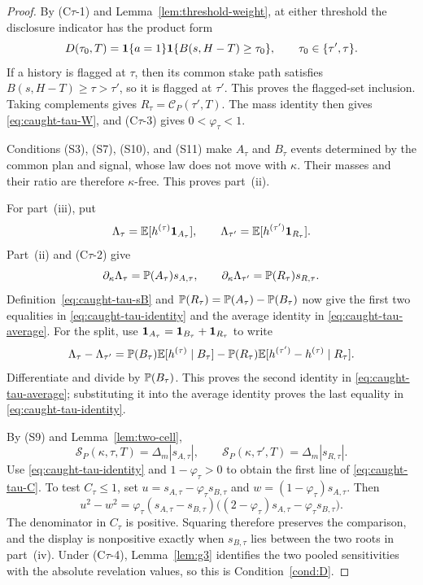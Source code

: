 \begin{proof}
By (C$\tau$-1) and Lemma~\ref{lem:threshold-weight}, at either threshold the disclosure indicator
has the product form
\[
D(\tau_0,T)=\mathbf{1}\{a=1\}\mathbf{1}\{B(s,H-T)\ge\tau_0\},
\qquad \tau_0\in\{\tau',\tau\}.
\]
If a history is flagged at $\tau$, then its common stake path satisfies
$B(s,H-T)\ge\tau>\tau'$, so it is flagged at $\tau'$. This proves the flagged-set inclusion.
Taking complements gives $R_\tau=\mathcal C_P(\tau',T)$. The mass identity then gives
\eqref{eq:caught-tau-W}, and (C$\tau$-3) gives $0<\varphi_\tau<1$.

Conditions (S3), (S7), (S10), and (S11) make $A_\tau$ and $B_\tau$ events determined by the common plan
and signal, whose law does not move with $\kappa$. Their masses and their ratio are therefore
$\kappa$-free. This proves part~(ii).

For part~(iii), put
\[
\Lambda_\tau=\mathbb{E}[h^{(\tau)}\mathbf{1}_{A_\tau}],
\qquad
\Lambda_{\tau'}=\mathbb{E}[h^{(\tau')}\mathbf{1}_{R_\tau}].
\]
Part~(ii) and (C$\tau$-2) give
\[
\partial_\kappa\Lambda_\tau=\mathbb{P}(A_\tau)s_{A,\tau},
\qquad
\partial_\kappa\Lambda_{\tau'}=\mathbb{P}(R_\tau)s_{R,\tau}.
\]
Definition~\eqref{eq:caught-tau-sB} and
$\mathbb{P}(R_\tau)=\mathbb{P}(A_\tau)-\mathbb{P}(B_\tau)$ now give the first two equalities in
\eqref{eq:caught-tau-identity} and the average identity in
\eqref{eq:caught-tau-average}. For the split, use
$\mathbf{1}_{A_\tau}=\mathbf{1}_{B_\tau}+\mathbf{1}_{R_\tau}$ to write
\[
\Lambda_\tau-\Lambda_{\tau'}
=\mathbb{P}(B_\tau)\mathbb{E}[h^{(\tau)}\mid B_\tau]
-\mathbb{P}(R_\tau)\mathbb{E}[h^{(\tau')}-h^{(\tau)}\mid R_\tau].
\]
Differentiate and divide by $\mathbb{P}(B_\tau)$. This proves the second identity in
\eqref{eq:caught-tau-average}; substituting it into the average identity proves the last equality in
\eqref{eq:caught-tau-identity}.

By (S9) and Lemma~\ref{lem:two-cell},
\[
\mathcal S_P(\kappa,\tau,T)=\Delta_m|s_{A,\tau}|,
\qquad
\mathcal S_P(\kappa,\tau',T)=\Delta_m|s_{R,\tau}|.
\]
Use \eqref{eq:caught-tau-identity} and $1-\varphi_\tau>0$ to obtain the first line of
\eqref{eq:caught-tau-C}. To test $C_\tau\le1$, set
$u=s_{A,\tau}-\varphi_\tau s_{B,\tau}$ and
$w=(1-\varphi_\tau)s_{A,\tau}$. Then
\[
u^2-w^2
=\varphi_\tau(s_{A,\tau}-s_{B,\tau})
\bigl((2-\varphi_\tau)s_{A,\tau}-\varphi_\tau s_{B,\tau}\bigr).
\]
The denominator in $C_\tau$ is positive. Squaring therefore preserves the comparison, and the
display is nonpositive exactly when $s_{B,\tau}$ lies between the two roots in part~(iv). Under
(C$\tau$-4), Lemma~\ref{lem:g3} identifies the two pooled sensitivities with the absolute revelation
values, so this is Condition~\ref{cond:D}.


\end{proof}
